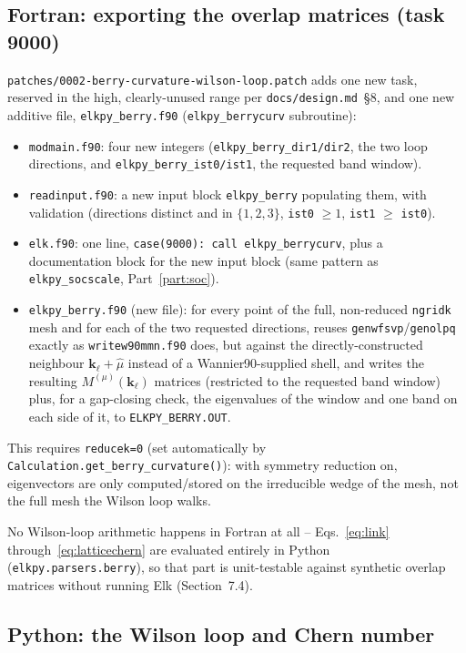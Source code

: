 \documentclass[11pt]{article}
\begin{document}
\subsection{Fortran: exporting the overlap matrices (task 9000)}

\texttt{patches/0002-berry-curvature-wilson-loop.patch} adds one new task, reserved in
the high, clearly-unused range per \texttt{docs/design.md}~\S8, and one new additive
file, \texttt{elkpy\_berry.f90} (\texttt{elkpy\_berrycurv} subroutine):
\begin{itemize}
  \item \texttt{modmain.f90}: four new integers (\texttt{elkpy\_berry\_dir1/dir2},
    the two loop directions, and \texttt{elkpy\_berry\_ist0/ist1}, the requested band
    window).
  \item \texttt{readinput.f90}: a new input block \texttt{elkpy\_berry} populating
    them, with validation (directions distinct and in $\{1,2,3\}$, \texttt{ist0}
    $\ge 1$, \texttt{ist1} $\ge$ \texttt{ist0}).
  \item \texttt{elk.f90}: one line, \texttt{case(9000): call elkpy\_berrycurv}, plus a
    documentation block for the new input block (same pattern as
    \texttt{elkpy\_socscale}, Part~\ref{part:soc}).
  \item \texttt{elkpy\_berry.f90} (new file): for every point of the full,
    non-reduced \texttt{ngridk} mesh and for each of the two requested directions,
    reuses \texttt{genwfsvp}/\texttt{genolpq} exactly as \texttt{writew90mmn.f90} does,
    but against the directly-constructed neighbour $\mathbf k_\ell+\hat\mu$ instead of
    a Wannier90-supplied shell, and writes the resulting $M^{(\mu)}(\mathbf k_\ell)$
    matrices (restricted to the requested band window) plus, for a gap-closing check,
    the eigenvalues of the window and one band on each side of it, to
    \texttt{ELKPY\_BERRY.OUT}.
\end{itemize}
This requires \texttt{reducek=0} (set automatically by
\texttt{Calculation.get\_berry\_curvature()}): with symmetry reduction on, eigenvectors
are only computed/stored on the irreducible wedge of the mesh, not the full mesh the
Wilson loop walks.

No Wilson-loop arithmetic happens in Fortran at all -- Eqs.~\eqref{eq:link}
through~\eqref{eq:latticechern} are evaluated entirely in Python
(\texttt{elkpy.parsers.berry}), so that part is unit-testable against synthetic overlap
matrices without running Elk (Section~7.4).

\subsection{Python: the Wilson loop and Chern number}
\end{document}
